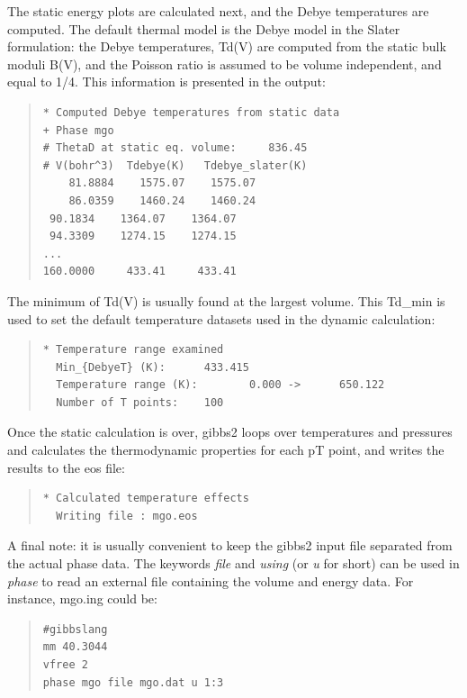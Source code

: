 \documentclass[a4paper]{article}
\begin{document}
The static energy plots are calculated next, and the Debye
temperatures are computed. The default thermal model is the Debye
model in the Slater formulation: the Debye temperatures, Td(V) are
computed from the static bulk moduli B(V), and the Poisson ratio is
assumed to be volume independent, and equal to 1/4. This information
is presented in the output:

\begin{quote}
\begin{verbatim}
* Computed Debye temperatures from static data
+ Phase mgo
# ThetaD at static eq. volume:     836.45
# V(bohr^3)  Tdebye(K)   Tdebye_slater(K)
    81.8884    1575.07    1575.07
    86.0359    1460.24    1460.24
 90.1834    1364.07    1364.07
 94.3309    1274.15    1274.15
...
160.0000     433.41     433.41
\end{verbatim}
\end{quote}

The minimum of Td(V) is usually found at the largest volume. This
Td\_min is used to set the default temperature datasets used in the
dynamic calculation:

\begin{quote}
\begin{verbatim}
* Temperature range examined
  Min_{DebyeT} (K):      433.415
  Temperature range (K):        0.000 ->      650.122
  Number of T points:    100
\end{verbatim}
\end{quote}

Once the static calculation is over, gibbs2 loops over temperatures
and pressures and calculates the thermodynamic properties for each pT
point, and writes the results to the eos file:

\begin{quote}
\begin{verbatim}
* Calculated temperature effects
  Writing file : mgo.eos
\end{verbatim}
\end{quote}

A final note: it is usually convenient to keep the gibbs2 input file
separated from the actual phase data. The keywords \emph{file} and \emph{using}
(or \emph{u} for short) can be used in \emph{phase} to read an external file
containing the volume and energy data. For instance, mgo.ing could be:

\begin{quote}
\begin{verbatim}
#gibbslang
mm 40.3044
vfree 2
phase mgo file mgo.dat u 1:3
\end{verbatim}
\end{quote}
\end{document}
